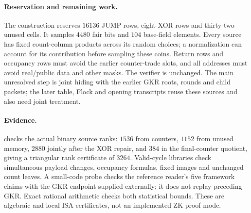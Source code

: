 \paragraph{Reservation and remaining work.} The construction reserves $16136$ JUMP rows, eight XOR rows and thirty-two unused cells. It samples $4480$ fair bits and $104$ base-field elements. Every source has fixed count-column products across its random choices; a normalization can account for its contribution before sampling these coins. Return rows and occupancy rows must avoid the earlier counter-trade slots, and all addresses must avoid real/public data and other masks. The verifier is unchanged. The main unresolved step is joint hiding with the earlier GKR roots, rounds and child packets; the later table, Flock and opening transcripts reuse these sources and also need joint treatment.

\paragraph{Evidence.}  checks the actual binary source ranks: $1536$ from counters, $1152$ from unused memory, $2880$ jointly after the XOR repair, and $384$ in the final-counter quotient, giving a triangular rank certificate of $3264$. Valid-cycle libraries check simultaneous payload changes, occupancy formulas, fixed images and unchanged count leaves. A small-code probe checks the reference reader's five framework claims with the GKR endpoint supplied externally; it does not replay preceding GKR. Exact rational arithmetic checks both statistical bounds. These are algebraic and local ISA certificates, not an implemented ZK proof mode.
